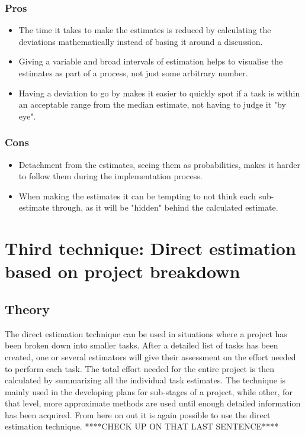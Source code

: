 \subsubsection{Pros}
\begin{itemize}
\item The time it takes to make the estimates is reduced by calculating the deviations mathematically instead of basing it around a discussion.
\item Giving a variable and broad intervals of estimation helps to visualise the estimates as part of a process, not just some arbitrary number.
\item Having a deviation to go by makes it easier to quickly spot if a task is within an acceptable range from the median estimate, not having to judge it "by eye".

\end{itemize}

\subsubsection{Cons}
\begin{itemize}
\item Detachment from the estimates, seeing them as probabilities, makes it harder to follow them during the implementation process.
\item When making the estimates it can be tempting to not think each sub-estimate through, as it will be "hidden" behind the calculated estimate.

\end{itemize}

\section{Third technique: Direct estimation based on project breakdown}
\subsection{Theory}
The direct estimation technique can be used in situations where a project has been broken down into smaller tasks. After a detailed list of tasks has been created, one or several estimators will give their assessment on the effort needed to perform each task. The total effort needed for the entire project is then calculated by summarizing all the individual task estimates.
The technique is mainly used in the developing plans for sub-stages of a project, while other, for that level, more approximate methods are used until enough detailed information has been acquired. From here on out it is again possible to use the direct estimation technique. ****CHECK UP ON THAT LAST SENTENCE****

